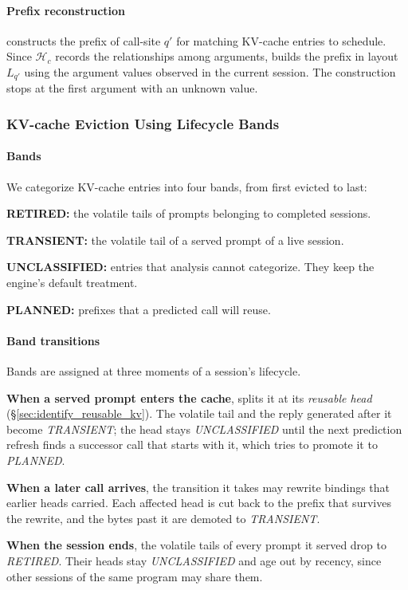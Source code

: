 
\paragraph{Prefix reconstruction}
\sysname constructs the prefix of call-site $q'$ for matching KV-cache entries to schedule. Since $\mathcal{H}_c$ records the relationships among arguments, \sysname builds the prefix in layout $L_{q'}$ using the argument values observed in the current session. The construction stops at the first argument with an unknown value.


\subsubsection{KV-cache Eviction Using Lifecycle Bands}
\paragraph{Bands}
We categorize KV-cache entries into four bands, from first evicted to last:
\begin{enumerate*}[label=(\arabic*)]
    \item \textbf{RETIRED:} the volatile tails of prompts belonging to completed sessions. 
    \item \textbf{TRANSIENT:} the volatile tail of a served prompt of a live session. 
    \item \textbf{UNCLASSIFIED:} entries that analysis cannot categorize. They keep the engine's default treatment.
    \item \textbf{PLANNED:} prefixes that a predicted call will reuse. 
\end{enumerate*}



\paragraph{Band transitions}
Bands are assigned at three moments of a session's lifecycle.
\begin{enumerate*}[label=(\arabic*)]
    \item \textbf{When a served prompt enters the cache}, \sysname splits it at its \emph{reusable head} (\S\ref{sec:identify_reusable_kv}). The volatile tail and the reply generated after it become \emph{TRANSIENT}; the head stays \emph{UNCLASSIFIED} until the next prediction refresh finds a successor call that starts with it, which tries to promote it to \emph{PLANNED}.
    \item \textbf{When a later call arrives}, the transition it takes may rewrite bindings that earlier heads carried. Each affected head is cut back to the prefix that survives the rewrite, and the bytes past it are demoted to \emph{TRANSIENT}.
    \item \textbf{When the session ends}, the volatile tails of every prompt it served drop to \emph{RETIRED}. Their heads stay \emph{UNCLASSIFIED} and age out by recency, since other sessions of the same program may share them.
\end{enumerate*}

